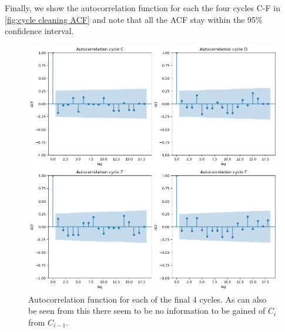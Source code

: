 \documentclass[../Thesis.tex]{subfiles}
\begin{document}
Finally, we show the autocorrelation function for each the four cycles C-F in \autoref{fig:cycle cleaning ACF} and note that all the ACF stay within the 95\% confidence interval.

\begin{figure}[h]
    \centering
    \includegraphics[width=0.8\linewidth]{figures/Multiple cycles data/Cleaning Autocorrelation.png}
    \caption{Autocorrelation function for each of the final 4 cycles. As can also be seen from this there seem to be no information to be gained of $C_i$ from $C_{i-1}$.}
    \label{fig:cycle cleaning ACF}
\end{figure}


\end{document}
